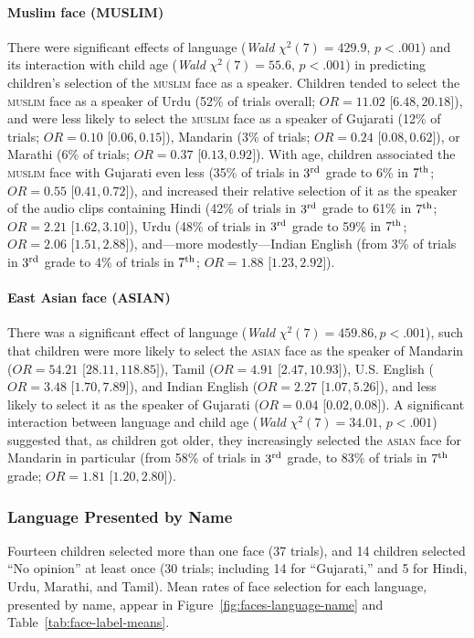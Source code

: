 \documentclass{foushee-adapted-preprint}
\newcommand{\facelabelmeanstab}{\ref{tab:face-label-means}}
\begin{document}
\paragraph*{Muslim face {\small{(MUSLIM)}}} 
There were significant effects of language (\textit{Wald} $\chi^2(7)=429.9$, $p<.001$) and its interaction with child age (\textit{Wald} $\chi^2(7)=55.6$, $p<.001$) in predicting children's selection of the \textsc{muslim} face as a speaker. 
Children tended to select the \textsc{muslim} face as a speaker of Urdu (52\% of trials overall; $OR=11.02$ [$6.48, 20.18]$), and were less likely to select the \textsc{muslim} face as a speaker of Gujarati (12\% of trials; 
$OR=0.10$ [$0.06, 0.15]$), Mandarin (3\% of trials; 
$OR=0.24$ [$0.08, 0.62]$), or Marathi (6\% of trials; 
$OR=0.37$ [$0.13, 0.92]$). 
With age, children associated the \textsc{muslim} face with Gujarati even less (35\% of trials in $3^{\textnormal{rd}}$ grade to 6\% in $7^{\textnormal{th}}$; 
$OR=0.55$ [$0.41, 0.72]$), and 
increased their relative selection of it as the speaker of the audio clips containing Hindi (42\% of trials in $3^{\textnormal{rd}}$ grade to 61\% in $7^{\textnormal{th}}$; 
$OR=2.21$ [$1.62, 3.10]$), Urdu (48\% of trials in $3^{\textnormal{rd}}$ grade to 59\% in $7^{\textnormal{th}}$; 
$OR=2.06$ [$1.51, 2.88]$), and---more modestly---Indian English (from 3\% of trials in $3^{\textnormal{rd}}$ grade to 4\% of trials in $7^{\textnormal{th}}$; $OR=1.88$ [$1.23, 2.92]$). 
%
\paragraph*{East Asian face {\small{(ASIAN)}}} 
There was a significant effect of language (\textit{Wald} $\chi^2(7)=459.86, p<.001$), such that children were more likely to select the \textsc{asian} face as the speaker of Mandarin ($OR=54.21$ [$28.11, 118.85]$), Tamil ($OR=4.91$ [$2.47, 10.93]$), U.S. English ($OR=3.48$ [$1.70, 7.89]$), and Indian English ($OR=2.27$ [$1.07, 5.26]$), and less likely to select it as the speaker of Gujarati ($OR=0.04$ [$0.02, 0.08]$).
A significant interaction between language and child age (\textit{Wald} $\chi^2(7)=34.01$, $p<.001$) suggested that, as children got older, they increasingly selected the \textsc{asian} face for Mandarin in particular (from 58\% of trials in $3^{\textnormal{rd}}$ grade, to 83\% of trials in $7^{\textnormal{th}}$ grade; $OR=1.81$ [$1.20, 2.80]$).
%
\subsubsection*{Language Presented by Name}
Fourteen children selected more than one face (37 trials), and 14 children selected ``No opinion'' at least once (30 trials; including 14 for ``Gujarati,'' and 5 for Hindi, Urdu, Marathi, and Tamil). 
Mean rates of face selection for each language, presented by name, appear in Figure~\ref{fig:faces-language-name} and Table~\facelabelmeanstab.
\end{document}
